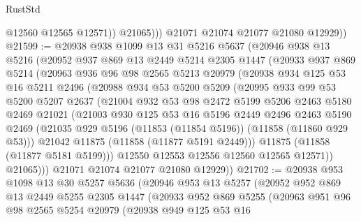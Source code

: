 \begin{lexlean}{RustStd}
\begin{coremodule}
                  @12560
                  @12565
                  @12571))
              @21065)))
        @21071
        @21074
        @21077
        @21080
        @12929))
@21599 := @20938
    @938
    @1099
    @13
    @31
    @5216
    @5637
    (@20946
      @938
      @13
      @5216
      (@20952
        @937
        @869
        @13
        @2449
        @5214
        @2305
        @1447
        (@20933
          @937
          @869
          @5214
          (@20963
            @936
            @96
            @98
            @2565
            @5213
            @20979
            (@20938
              @934
              @125
              @53
              @16
              @5211
              @2496
              (@20988
                @934
                @53
                @5200
                @5209
                (@20995
                  @933
                  @99
                  @53
                  @5200
                  @5207
                  @2637
                  (@21004
                    @932
                    @53
                    @98
                    @2472
                    @5199
                    @5206
                    @2463
                    @5180
                    @2469
                    @21021
                    (@21003
                      @930
                      @125
                      @53
                      @16
                      @5196
                      @2449
                      @2496
                      @2463
                      @5190
                      @2469
                      (@21035 @929 @5196 (@11853 (@11854 @5196)) (@11858 (@11860 @929 @53)))
                      @21042
                      @11875
                      (@11858 (@11877 @5191 @2449)))
                    @11875
                    (@11858 (@11877 @5181 @5199)))
                  @12550
                  @12553
                  @12556
                  @12560
                  @12565
                  @12571))
              @21065)))
        @21071
        @21074
        @21077
        @21080
        @12929))
@21702 := @20938
    @953
    @1098
    @13
    @30
    @5257
    @5636
    (@20946
      @953
      @13
      @5257
      (@20952
        @952
        @869
        @13
        @2449
        @5255
        @2305
        @1447
        (@20933
          @952
          @869
          @5255
          (@20963
            @951
            @96
            @98
            @2565
            @5254
            @20979
            (@20938
              @949
              @125
              @53
              @16

\end{coremodule}
\end{lexlean}
